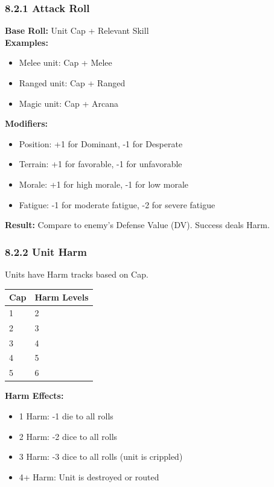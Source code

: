 \documentclass[11pt]{article}
\begin{document}
\subsubsection{8.2.1 Attack Roll}

\textbf{Base Roll:} Unit Cap + Relevant Skill\\
\textbf{Examples:}
\begin{itemize}
  \item Melee unit: Cap + Melee
  \item Ranged unit: Cap + Ranged
  \item Magic unit: Cap + Arcana
\end{itemize}

\textbf{Modifiers:}
\begin{itemize}
  \item Position: +1 for Dominant, -1 for Desperate
  \item Terrain: +1 for favorable, -1 for unfavorable
  \item Morale: +1 for high morale, -1 for low morale
  \item Fatigue: -1 for moderate fatigue, -2 for severe fatigue
\end{itemize}

\textbf{Result:} Compare to enemy's Defense Value (DV). Success deals Harm.

\subsubsection{8.2.2 Unit Harm}

Units have Harm tracks based on Cap.

\begin{tabular}{|l|l|}
\hline
Cap & Harm Levels \\
\hline
1 & 2 \\
\hline
2 & 3 \\
\hline
3 & 4 \\
\hline
4 & 5 \\
\hline
5 & 6 \\
\hline
\end{tabular}

\textbf{Harm Effects:}
\begin{itemize}
  \item 1 Harm: -1 die to all rolls
  \item 2 Harm: -2 dice to all rolls
  \item 3 Harm: -3 dice to all rolls (unit is crippled)
  \item 4+ Harm: Unit is destroyed or routed
\end{itemize}
\end{document}
